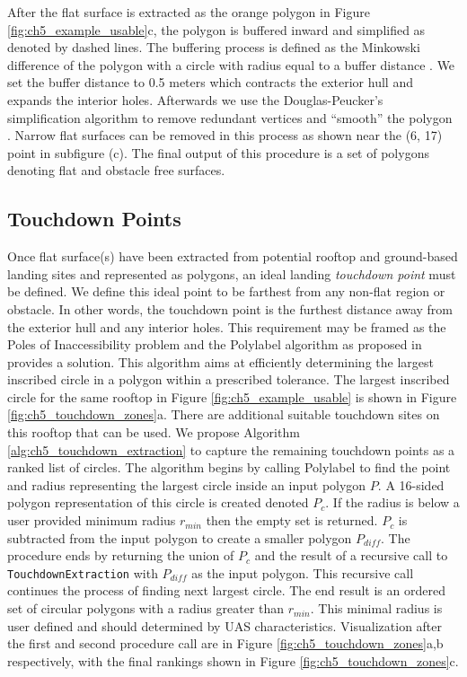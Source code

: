 After the flat surface is extracted as the orange polygon in Figure \ref{fig:ch5_example_usable}c, the polygon is buffered inward and simplified as denoted by dashed lines. The buffering process is defined as the Minkowski difference of the polygon with a circle with radius equal to a buffer distance \cite{agarwal2002polygon}. We set the buffer distance to 0.5 meters which contracts the exterior hull and expands the interior holes.  Afterwards we use the Douglas-Peucker's simplification algorithm to remove redundant vertices and ``smooth'' the polygon \cite{douglas_algorithms_1973}.
Narrow flat surfaces can be removed in this process as shown near the (6, 17) point in subfigure (c). The final output of this procedure is a set of polygons denoting flat and obstacle free surfaces.

\subsection{Touchdown Points}\label{sec:ch5_method_circle}\label{sec:ch5_touchdown}
Once flat surface(s) have been extracted from potential rooftop and ground-based landing sites and represented as polygons, an ideal landing \emph{touchdown point} must be defined. We define this ideal point to be farthest from any non-flat region or obstacle. In other words, the touchdown point is the furthest distance away from the exterior hull and any interior holes. This requirement may be framed as the Poles of Inaccessibility problem \cite{garcia-castellanos_poles_2007} and the Polylabel algorithm as proposed in \cite{noauthor_github_2018-3} provides a solution. This algorithm aims at efficiently determining the largest inscribed circle in a polygon within a prescribed tolerance. The largest inscribed circle for the same rooftop in Figure \ref{fig:ch5_example_usable} is shown in Figure \ref{fig:ch5_touchdown_zones}a. 
There are additional suitable touchdown sites on this rooftop that can be used. We propose Algorithm \ref{alg:ch5_touchdown_extraction} to capture the remaining touchdown points as a ranked list of circles. The algorithm begins by calling Polylabel to find the point and radius representing the largest circle inside an input polygon $P$.  A 16-sided polygon representation of this circle is created denoted $P_c$. If the radius is below a user provided minimum radius $r_{min}$ then the empty set is returned. $P_c$ is subtracted from the input polygon to create a smaller polygon $P_{diff}$. The procedure ends by returning the union of $P_c$ and the result of a recursive call to \texttt{TouchdownExtraction} with $P_{diff}$ as the input polygon. This recursive call continues the process of finding next largest circle. The end result is an ordered set of circular polygons with a radius greater than $r_{min}$. This minimal radius is user defined and should determined by \ac{UAS} characteristics. Visualization after the first and second procedure call are in Figure \ref{fig:ch5_touchdown_zones}a,b respectively, with the final rankings shown in Figure \ref{fig:ch5_touchdown_zones}c.

